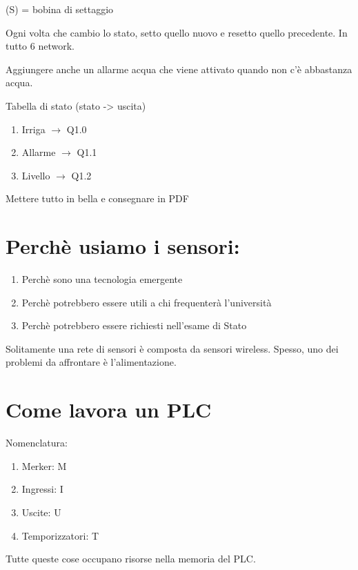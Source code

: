\documentclass{article}
\begin{document}
    (S) = bobina di settaggio

    Ogni volta che cambio lo stato, setto quello nuovo e resetto quello precedente.
    In tutto 6 network.

    Aggiungere anche un allarme acqua che viene attivato quando non c'è abbastanza acqua.

    Tabella di stato (stato -> uscita)
    \begin{enumerate}
        \item Irriga $\rightarrow$ Q1.0
        \item Allarme $\rightarrow$ Q1.1
        \item Livello $\rightarrow$ Q1.2
    \end{enumerate}

    Mettere tutto in bella e consegnare in PDF

    \section{Perchè usiamo i sensori:}

    \begin{enumerate}
        \item Perchè sono una tecnologia emergente
        \item Perchè potrebbero essere utili a chi frequenterà l'università
        \item Perchè potrebbero essere richiesti nell'esame di Stato
    \end{enumerate}

    Solitamente una rete di sensori è composta da sensori wireless.
    Spesso, uno dei problemi da affrontare è l'alimentazione.

    \section{Come lavora un PLC}

    Nomenclatura:
    \begin{enumerate}
        \item Merker: M
        \item Ingressi: I
        \item Uscite: U
        \item Temporizzatori: T
    \end{enumerate}

    Tutte queste cose occupano risorse nella memoria del PLC.
    \vspace{1cm}
\end{document}
